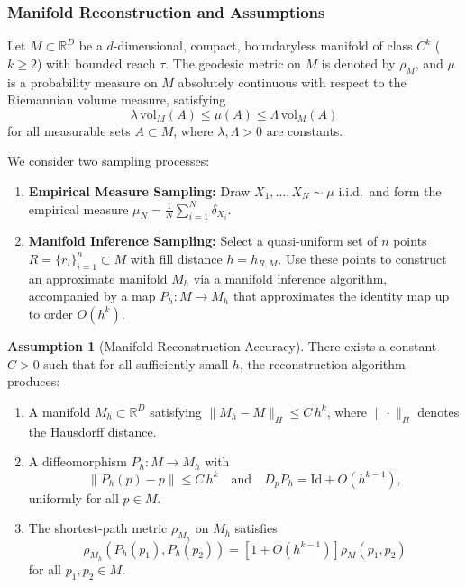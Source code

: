 \documentclass{article}
\theoremstyle{plain}
\theoremstyle{definition}
\newtheorem{assumption}[theorem]{Assumption}
\theoremstyle{remark}
\begin{document}
\subsubsection{Manifold Reconstruction and Assumptions}

Let $M \subset \mathbb{R}^D$ be a $d$-dimensional, compact, boundaryless manifold of class $C^k$ ($k \geq 2$) with bounded reach $\tau$. The geodesic metric on $M$ is denoted by $\rho_M$, and $\mu$ is a probability measure on $M$ absolutely continuous with respect to the Riemannian volume measure, satisfying
$$
\lambda \, \mathrm{vol}_M(A) \leq \mu(A) \leq \Lambda \, \mathrm{vol}_M(A)
$$
for all measurable sets $A \subset M$, where $\lambda, \Lambda > 0$ are constants.

We consider two sampling processes:
\begin{enumerate}
    \item \textbf{Empirical Measure Sampling:} Draw $X_1, \dots, X_N \sim \mu$ i.i.d.\ and form the empirical measure $\mu_N = \frac{1}{N} \sum_{i=1}^N \delta_{X_i}$.
    \item \textbf{Manifold Inference Sampling:} Select a quasi-uniform set of $n$ points $R = \{r_i\}_{i=1}^n \subset M$ with fill distance $h = h_{R, M}$. Use these points to construct an approximate manifold $M_h$ via a manifold inference algorithm, accompanied by a map $P_h: M \to M_h$ that approximates the identity map up to order $O(h^k)$.
\end{enumerate}

\begin{assumption}[Manifold Reconstruction Accuracy]
\label{assump:manifold-inference}
There exists a constant $C > 0$ such that for all sufficiently small $h$, the reconstruction algorithm produces:
\begin{enumerate}
    \item A manifold $M_h \subset \mathbb{R}^D$ satisfying $\|M_h - M\|_H \leq C\,h^k$, where $\|\cdot\|_H$ denotes the Hausdorff distance.
    \item A diffeomorphism $P_h: M \to M_h$ with
    $$
    \|P_h(p) - p\| \leq C\,h^k \quad \text{and} \quad D_p P_h = \mathrm{Id} + O(h^{k-1}),
    $$
    uniformly for all $p \in M$.
    \item The shortest-path metric $\rho_{M_h}$ on $M_h$ satisfies
    $$
    \rho_{M_h}(P_h(p_1), P_h(p_2)) = [1 + O(h^{k-1})] \rho_M(p_1, p_2)
    $$
    for all $p_1, p_2 \in M$.
\end{enumerate}
\end{assumption}
\end{document}
